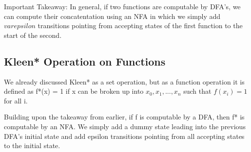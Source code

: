 Important Takeaway: In general, if two functions are computable by DFA's, we can compute their concatentation using an NFA in which we simply add $varepsilon$ transitions pointing from accepting states of the first function to the start of the second.
\begin{center}
\end{center}

\subsection*{Kleen* Operation on Functions}
We already discussed Kleen* as a set operation, but as a function operation it is defined as f*(x) = 1 if x can be broken up into $x_0, x_1, ..., x_n$ such that $f(x_i) = 1$ for all i.

Building upon the takeaway from earlier, if f is computable by a DFA, then f* is computable by an NFA. We simply add a dummy state leading into the previous DFA's initial state and add epsilon transitions pointing from all accepting states to the initial state.
\begin{center}
\end{center}